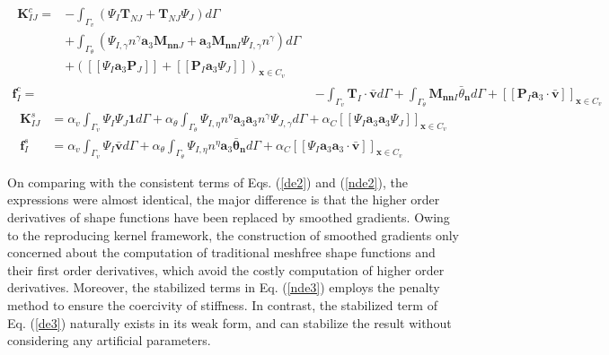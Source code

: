 \begin{subequations}\label{nde2}
\begin{align}
\begin{split}
\boldsymbol K^c_{IJ} = &- \int_{\Gamma_v} (\Psi_I \boldsymbol T_{NJ} + \boldsymbol T_{NJ} \Psi_J) d\Gamma \\
                                     &+ \int_{\Gamma_\theta} (\Psi_{I,\gamma} n^\gamma \boldsymbol a_3 \boldsymbol M_{\boldsymbol{nn}J} + \boldsymbol a_3 \boldsymbol M_{\boldsymbol{nn}I} \Psi_{I,\gamma}n^\gamma)d\Gamma \\
                                     & + ([[\Psi_I \boldsymbol a_3 \boldsymbol P_J]] + [[\boldsymbol P_I \boldsymbol a_3 \Psi_J]])_{\boldsymbol x \in C_v}
\end{split} \\
\boldsymbol f^c_I = &- \int_{\Gamma_v} \boldsymbol T_I \cdot \bar{\boldsymbol v} d\Gamma + \int_{\Gamma_\theta} \boldsymbol M_{\boldsymbol{nn}I} \bar{\theta}_{\boldsymbol n} d\Gamma + [[\boldsymbol P_I\boldsymbol a_3 \cdot \bar{\boldsymbol v}]]_{\boldsymbol x \in C_v}
\end{align}
\end{subequations}
\begin{subequations}\label{nde3}
\begin{align}
\boldsymbol K^s_{IJ} &= \alpha_v \int_{\Gamma_v} \Psi_I \Psi_J \boldsymbol 1 d\Gamma 
+ \alpha_\theta \int_{\Gamma_\theta} \Psi_{I,\eta} n^\eta \boldsymbol a_3 \boldsymbol a_3 n^\gamma\Psi_{J,\gamma} d\Gamma + \alpha_C [[\Psi_I \boldsymbol a_3 \boldsymbol a_3 \Psi_J]]_{\boldsymbol x \in C_v} \\
\boldsymbol f^s_I &= \alpha_v \int_{\Gamma_v} \Psi_I \bar{\boldsymbol v} d\Gamma + \alpha_\theta \int_{\Gamma_\theta} \Psi_{I,\eta} n^\eta \boldsymbol a_3 \boldsymbol \bar \theta_{\boldsymbol n} d\Gamma + \alpha_C [[\Psi_I \boldsymbol a_3 \boldsymbol a_3 \cdot \bar{\boldsymbol v}]]_{\boldsymbol x \in C_v}
\end{align}
\end{subequations}

On comparing with the consistent terms of Eqs. (\ref{de2}) and (\ref{nde2}), the expressions were almost identical, the major difference is that the higher order derivatives of shape functions have been replaced by smoothed gradients. Owing to the reproducing kernel framework, the construction of smoothed gradients only concerned about the computation of traditional meshfree shape functions and their first order derivatives, which avoid the costly computation of higher order derivatives. Moreover, the stabilized terms in Eq. (\ref{nde3}) employs the penalty method to ensure the coercivity of stiffness. In contrast, the stabilized term of Eq. (\ref{de3}) naturally exists in its weak form, and can stabilize the result without considering any artificial parameters.
 
